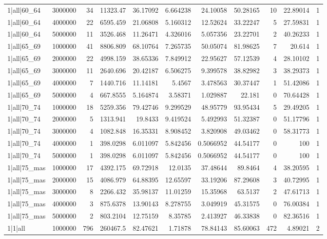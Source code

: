 \begin{tabular}{lrrrrrrrrrr}
1|all|60\_64 & 3000000 & 34 & 11323.47 & 36.17092 & 6.664238 & 24.10058 & 50.28165 & 10 & 22.89014 & 1 \\
1|all|60\_64 & 4000000 & 22 & 6595.459 & 21.06808 & 5.160312 & 12.52624 & 33.22247 & 5 & 27.59831 & 1 \\
1|all|60\_64 & 5000000 & 11 & 3526.468 & 11.26471 & 4.326016 & 5.057356 & 23.22701 & 2 & 40.26233 & 1 \\
1|all|65\_69 & 1000000 & 41 & 8806.809 & 68.10764 & 7.265735 & 50.05074 & 81.98625 & 7 & 20.614 & 1 \\
1|all|65\_69 & 2000000 & 22 & 4998.159 & 38.65336 & 7.849912 & 22.95627 & 57.12539 & 4 & 28.10102 & 1 \\
1|all|65\_69 & 3000000 & 11 & 2640.696 & 20.42187 & 6.506275 & 9.399578 & 38.82982 & 3 & 38.29373 & 1 \\
1|all|65\_69 & 4000000 & 7 & 1440.716 & 11.14181 & 5.4567 & 3.478563 & 30.37447 & 1 & 51.42086 & 1 \\
1|all|65\_69 & 5000000 & 4 & 667.8555 & 5.164874 & 3.58371 & 1.029887 & 22.181 & 0 & 70.64428 & 1 \\
1|all|70\_74 & 1000000 & 18 & 5259.356 & 79.42746 & 9.299529 & 48.95779 & 93.95434 & 5 & 29.49205 & 1 \\
1|all|70\_74 & 2000000 & 5 & 1313.941 & 19.8433 & 9.419524 & 5.492993 & 51.32387 & 0 & 51.17796 & 1 \\
1|all|70\_74 & 3000000 & 4 & 1082.848 & 16.35331 & 8.908452 & 3.820908 & 49.03462 & 0 & 58.31773 & 1 \\
1|all|70\_74 & 4000000 & 1 & 398.0298 & 6.011097 & 5.842456 & 0.5066952 & 44.54177 & 0 & 100 & 1 \\
1|all|70\_74 & 5000000 & 1 & 398.0298 & 6.011097 & 5.842456 & 0.5066952 & 44.54177 & 0 & 100 & 1 \\
1|all|75\_mas & 1000000 & 17 & 4392.175 & 69.72918 & 12.0135 & 37.48644 & 89.8464 & 4 & 38.20595 & 1 \\
1|all|75\_mas & 2000000 & 15 & 4086.979 & 64.88395 & 12.65597 & 33.19206 & 87.29608 & 3 & 40.72995 & 1 \\
1|all|75\_mas & 3000000 & 8 & 2266.432 & 35.98137 & 11.01259 & 15.35968 & 63.5137 & 2 & 47.61713 & 1 \\
1|all|75\_mas & 4000000 & 3 & 875.6378 & 13.90143 & 8.278755 & 3.049919 & 45.31575 & 0 & 76.00384 & 1 \\
1|all|75\_mas & 5000000 & 2 & 803.2104 & 12.75159 & 8.35785 & 2.413927 & 46.33838 & 0 & 82.36516 & 1 \\
1|1|all & 1000000 & 796 & 260467.5 & 82.47621 & 1.71878 & 78.84143 & 85.60063 & 472 & 4.89021 & 2 \\

\end{tabular}

